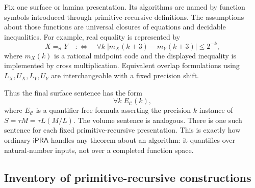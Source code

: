 \documentclass[11pt]{article}
\theoremstyle{definition}
\newcommand{\ipra}{\mathsf{iPRA}}
\newcommand{\Eq}{\mathrel{=_{\!\mathsf R}}}
\newcommand{\abs}[1]{\left|#1\right|}
\begin{document}
Fix one surface or lamina presentation.  Its algorithms are named by function
symbols introduced through primitive-recursive definitions.  The assumptions
about those functions are universal closures of equations and decidable
inequalities.  For example, real equality is represented by
\begin{equation}
 X\Eq Y
 \quad:\Longleftrightarrow\quad
 \forall k\;
 \abs{m_X(k+3)-m_Y(k+3)}\leq2^{-k},
 \label{eq:real-equality-code}
\end{equation}
where $m_X(k)$ is a rational midpoint code and the displayed inequality is
implemented by cross multiplication.  Equivalent overlap formulations using
$L_X,U_X,L_Y,U_Y$ are interchangeable with a fixed precision shift.

Thus the final surface sentence has the form
\[
 \forall k\;E_{\mathcal C}(k),
\]
where $E_{\mathcal C}$ is a quantifier-free formula asserting the precision
$k$ instance of
$S=\tau M=\tau L(M/L)$.  The volume sentence is analogous.  There is one such
sentence for each fixed primitive-recursive presentation.  This is exactly how
ordinary $\ipra$ handles any theorem about an algorithm: it quantifies over
natural-number inputs, not over a completed function space.

\subsection{Inventory of primitive-recursive constructions}
\end{document}
